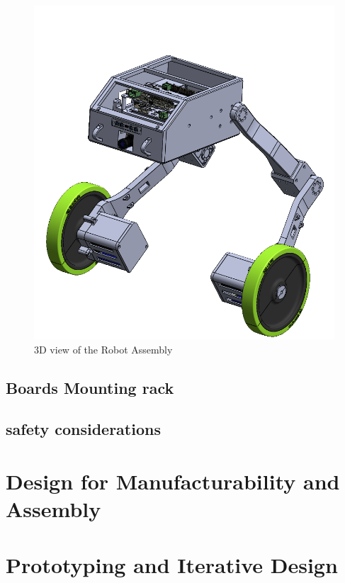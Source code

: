 \begin{figure}[h]
	\centering
	\includegraphics[width=1\linewidth]{Robot_Assembly_3}
	\caption[3D view of the Robot Assembly]{3D view of the Robot Assembly}
	\label{fig:robotassembly3}
\end{figure}
\subsection{Boards Mounting rack}
\subsection{safety considerations}




\section{Design for Manufacturability and Assembly}
\section{Prototyping and Iterative Design}


